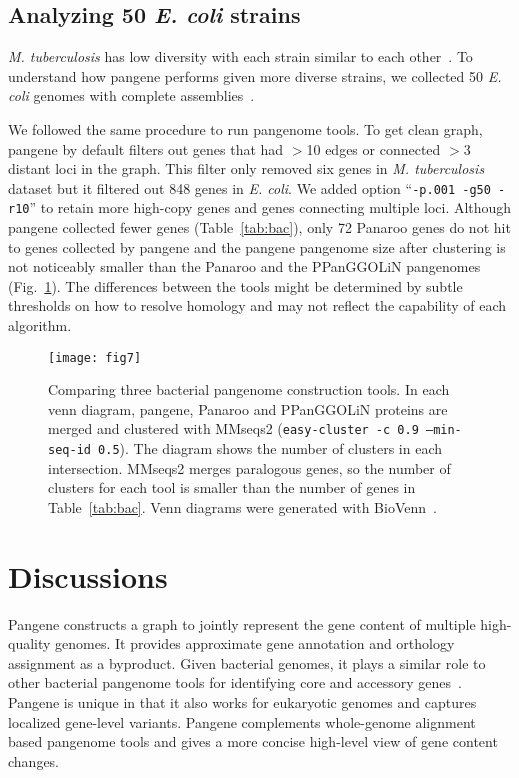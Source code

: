 \documentclass[webpdf,contemporary,large,namedate]{oup-authoring-template}%
\begin{document}
\subsection{Analyzing 50 \textit{E. coli} strains}

\emph{M. tuberculosis} has low diversity with each strain similar to each other~\citep{Marin:2022aa}.
To understand how pangene performs given more diverse strains,
we collected 50 \emph{E. coli} genomes with complete assemblies~\citep{Shaw:2021aa}.

We followed the same procedure to run pangenome tools.
To get clean graph, pangene by default filters out genes that had $>$10 edges or connected $>$3 distant loci in the graph.
This filter only removed six genes in \emph{M. tuberculosis} dataset but
it filtered out 848 genes in \emph{E. coli}.
We added option ``{\tt -p.001 -g50 -r10}'' to retain more high-copy genes and genes connecting multiple loci.
Although pangene collected fewer genes (Table~\ref{tab:bac}),
only 72 Panaroo genes do not hit to genes collected by pangene
and the pangene pangenome size after clustering is not noticeably smaller than the Panaroo and the PPanGGOLiN pangenomes (Fig.~\ref{fig:bac-venn}).
The differences between the tools might be determined by subtle thresholds on how to resolve homology
and may not reflect the capability of each algorithm.

\begin{figure}[t!]
\centering
\texttt{[image: fig7]}
\caption{Comparing three bacterial pangenome construction tools.
In each venn diagram, pangene, Panaroo and PPanGGOLiN proteins are merged and
clustered with MMseqs2 ({\tt easy-cluster -c 0.9 --min-seq-id 0.5}).
The diagram shows the number of clusters in each intersection.
MMseqs2 merges paralogous genes, so the number of clusters for each tool
is smaller than the number of genes in Table~\ref{tab:bac}.
Venn diagrams were generated with BioVenn~\citep{Hulsen:2008aa}.
}\label{fig:bac-venn}
\end{figure}

\section{Discussions}

Pangene constructs a graph to jointly represent the gene content of multiple high-quality genomes.
It provides approximate gene annotation and orthology assignment as a byproduct.
Given bacterial genomes, it plays a similar role to other bacterial pangenome tools
for identifying core and accessory genes~\citep{Tonkin-Hill:2023aa}.
Pangene is unique in that it also works for eukaryotic genomes
and captures localized gene-level variants.
Pangene complements whole-genome alignment based pangenome tools
and gives a more concise high-level view of gene content changes.
\end{document}
